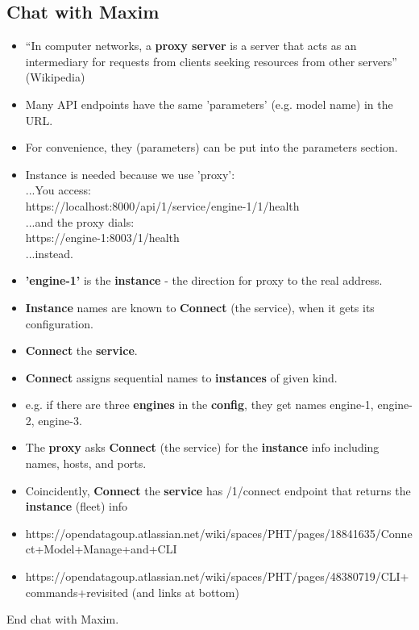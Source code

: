 \documentclass{article}
\begin{document}
\subsection*{Chat with Maxim}
\begin{itemize}
\item ``In computer networks, a {\bf proxy server} is a server that acts as an intermediary for requests from clients seeking resources from other servers'' (Wikipedia)
\item Many API endpoints have the same 'parameters' (e.g. model name) in the URL. 
\item For convenience, they (parameters) can be put into the parameters section. 
\item Instance is needed because we use 'proxy': \\
...You access: \\
https://localhost:8000/api/1/service/engine-1/1/health \\
...and the proxy dials: \\
https://engine-1:8003/1/health \\
...instead. 
\item {\bf 'engine-1'} is the {\bf instance} - the direction for proxy to the real address.
\item {\bf Instance} names are known to {\bf Connect} (the service), when it gets its configuration. 
\item {\bf Connect} the {\bf service}.
\item {\bf Connect} assigns sequential names to {\bf instances} of given kind. 
\item e.g. if there are three {\bf engines} in the {\bf config}, they get names engine-1, engine-2, engine-3.
\item The {\bf proxy} asks {\bf Connect} (the service) for the {\bf instance} info including names, hosts, and ports.
\item Coincidently, {\bf Connect} the {\bf service} has /1/connect endpoint that returns the {\bf instance} (fleet) info
\item https://opendatagoup.atlassian.net/wiki/spaces/PHT/pages/18841635/Connect+Model+Manage+and+CLI
\item https://opendatagoup.atlassian.net/wiki/spaces/PHT/pages/48380719/CLI+commands+revisited (and links at bottom)
\end{itemize}
End chat with Maxim. \\
\end{document}
